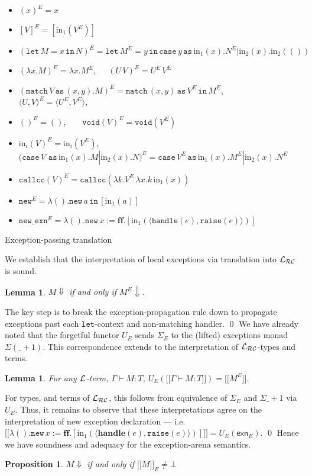 \documentclass{eptcs}
\def\[{\ensuremath{[ \! [}}
\def\]{\ensuremath{] \! ]}}
\def\L{{\cal{L}}}
\newcommand{\cse}{{\mathtt{case}}}
\newcommand{\as}{{\mathtt{as}}}
\newcommand{\void}{{\mathtt{void}}}
\newcommand{\match}{{\mathtt{match}}}
\newcommand{\lett}{{\mathtt{let}}}
\newcommand{\spc}{\hspace{2pt}}
\newcommand{\inj}{\mathrm{in}}
\newcommand{\callcc}{{\mathtt{callcc}}}
\newcommand{\Lc}{{\cal{L_{RC}}}}
\newcommand{\nxn}{{\mathtt{new\_exn}}}
\newcommand{\rais}{{\mathtt{raise} }}
\newcommand{\new}{{\mathtt{new}}}
\newcommand{\xcell}{{\mathsf{exn}}}
\newcommand{\handl}{{\mathbf{handle}}}
\newcommand{\ff}{{\mathbf{ff}}}
\newcommand{\inn}{{{\mathtt{in}}}}
\newtheorem{lemma}[theorem]{Lemma}
\newtheorem{proposition}[theorem]{Proposition}
\newif\ifqed
\newcommand{\qed}{\global\qedfalse\noindent\unskip\penalty50\null\nobreak\hskip1em\nobreak\hfill$\Box$}
\let\Box\undefined
\newenvironment{proof}[1][Proof]{\global\qedtrue\trivlist\item[\hskip\labelsep\textsc{#1:}]}{\ifqed\qed\fi\endtrivlist}
\begin{document}
{\begin{table}
\begin{itemize}
\item $(x)^E = x$ 
\item  $[V]^E = [\inj_1(V^E)]$ 
\item $(\lett\spc M = x\spc \inn\spc N)^E = \lett\spc M^E = y\spc \inn \spc \cse\spc y\spc \as\spc \inj_1(x).N^E|\inj_2(x).\inj_2(())$
\item  $(\lambda x.M)^E = \lambda x.M^E$,\ \ \  $(U\spc V)^E = U^E \spc V^E$ 
\item $(\match\spc V\spc \as\spc (x,y).M)^E = \match\spc (x,y)\spc \as\spc V^E\spc \inn \spc M^E$, \ \ \ \ $\langle U,V\rangle^E = \langle U^E,V^E\rangle$,
\item  $()^E = ()$,\ \ \ \ $\void(V)^E = \void(V^E)$
\item $\inj_i(V)^E = \inj_i(V^E)$, \ \ 
 $(\cse\spc V\spc \spc \as\spc \inj_1(x).M|\inj_2(x).N)^E = \cse\spc V^E\spc\as\spc \inj_1(x).M^E|\inj_2(x).N^E $ 
\item $\callcc(V)^E = \callcc(\lambda k.V^E\spc \lambda x.k\spc \inj_1(x))$  
\item $\new^E = \lambda ().\new\spc a\spc \inn\spc [\inj_1(a)]$ 
\item $\nxn^E =\lambda ().\new\spc x:=\ff.[\inj_1(\langle {\mathtt{handle}}(e),\rais(e)\rangle)]$
\end{itemize}
\caption{Exception-passing translation}
\end{table}
We establish that the interpretation of local exceptions via translation into $\Lc$ is sound.
\begin{lemma}$M \Downarrow$ if and only if $M^E \Downarrow$.  
\end{lemma}
\begin{proof}
The key step is to  break the exception-propagation rule down to propagate exceptions past each  $\lett$-context and non-matching handler.  
\end{proof}
We have already noted that the forgetful functor $U_E$ sends $\Sigma_E$ to the (lifted) exceptions monad $\Sigma(\_ + 1)$. This correspondence extends  to the interpretation of $\Lc$-types and terms.
\begin{lemma}For any  $\L$-term, $\Gamma \vdash M:T$, $U_E(\[\Gamma \vdash M:T\]) = \[M^{E}\]$.
\end{lemma}
\begin{proof}For types, and terms of $\Lc$, this follows from equivalence of $\Sigma_E$ and $\Sigma\_ +1$ via $U_E$. Thus, it remains to observe that these interpretations agree on the interpretation of new exception declaration --- i.e.
$\[\lambda ().\new\spc x:=\ff.[\inj_1(\langle \handl(e),\rais(e)\rangle)]\] = U_E(\xcell_E)$.
\end{proof}
Hence we have soundness and adequacy for the exception-arena semantics. 
\begin{proposition}$M \Downarrow$ if and only if $\[M\]_E \not=\bot$  
\end{proposition}



}
\end{document}
